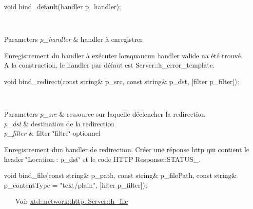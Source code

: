\begin{DoxyItemize}
\item 
\begin{DoxyCode}
\textcolor{keywordtype}{void} bind\_default(handler p\_handler); 
\end{DoxyCode}
 ~\newline
~\newline
 
\begin{DoxyParams}{Parameters}
{\em p\+\_\+handler} & handler à enregistrer\\
\hline
\end{DoxyParams}
Enregistrement du handler à exécuter lorsqu\textquotesingle{}aucun handler valide n\textquotesingle{}a été trouvé. A la construction, le handler par défaut est Server\+::h\+\_\+error\+\_\+template. ~\newline
~\newline

\item 
\begin{DoxyCode}
\textcolor{keywordtype}{void} bind\_redirect(\textcolor{keyword}{const} \textcolor{keywordtype}{string}& p\_src, \textcolor{keyword}{const} \textcolor{keywordtype}{string}& p\_dst, [filter p\_filter]); 
\end{DoxyCode}
 ~\newline
~\newline
 
\begin{DoxyParams}{Parameters}
{\em p\+\_\+src} & ressource sur laquelle déclencher la redirection \\
\hline
{\em p\+\_\+dst} & destination de la redirection \\
\hline
{\em p\+\_\+filter} & filter \char`\"{}filtre\char`\"{} optionnel\\
\hline
\end{DoxyParams}
Enregistrement d\textquotesingle{}un handler de redirection. Créer une réponse http qui contient le header \char`\"{}\+Location \+: p\+\_\+dst\char`\"{} et le code H\+T\+TP Response\+::\+S\+T\+A\+T\+U\+S\+\_. ~\newline
~\newline

\item 
\begin{DoxyCode}
\textcolor{keywordtype}{void} bind\_file(\textcolor{keyword}{const} \textcolor{keywordtype}{string}& p\_path,
               \textcolor{keyword}{const} \textcolor{keywordtype}{string}& p\_filePath,
               \textcolor{keyword}{const} \textcolor{keywordtype}{string}& p\_contentType = \textcolor{stringliteral}{"text/plain"},
               [filter            p\_filter]);
\end{DoxyCode}
 ~\newline
~\newline
 Voir \hyperlink{classxtd_1_1network_1_1http_1_1Server_ab3525557fb71fe7ffec9bf68b61db107}{xtd\+::network\+::http\+::\+Server\+::h\+\_\+file} ~\newline
~\newline


\end{DoxyItemize}
